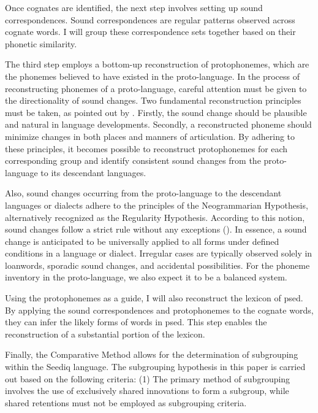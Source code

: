 Once cognates are identified, the next step involves setting up sound correspondences. Sound correspondences are regular patterns observed across cognate words. I will group these correspondence sets together based on their phonetic similarity. 

The third step employs a bottom-up reconstruction of protophonemes, which are the phonemes believed to have existed in the proto-language. In the process of reconstructing phonemes of a proto-language, careful attention must be given to the directionality of sound changes. Two fundamental reconstruction principles must be taken, as pointed out by \textcite[85]{crowley2010introduction}. Firstly, the sound change should be plausible and natural in language developments. Secondly, a reconstructed phoneme should minimize changes in both places and manners of articulation. By adhering to these principles, it becomes possible to reconstruct protophonemes for each corresponding group and identify consistent sound changes from the proto-language to its descendant languages.

Also, sound changes occurring from the proto-language to the descendant languages or dialects adhere to the principles of the Neogrammarian Hypothesis, alternatively recognized as the Regularity Hypothesis. According to this notion, sound changes follow a strict rule without any exceptions (\cite{brugmann1878morphologische}). In essence, a sound change is anticipated to be universally applied to all forms under defined conditions in a language or dialect. Irregular cases are typically observed solely in loanwords, sporadic sound changes, and accidental possibilities. For the phoneme inventory in the proto-language, we also expect it to be a balanced system. 

Using the protophonemes as a guide, I will also reconstruct the lexicon of \acl{psed}. By applying the sound correspondences and protophonemes to the cognate words, they can infer the likely forms of words in \acl{psed}. This step enables the reconstruction of a substantial portion of the lexicon.

Finally, the Comparative Method allows for the determination of subgrouping within the Seediq language. The subgrouping hypothesis in this paper is carried out based on the following criteria: (1) The primary method of subgrouping involves the use of exclusively shared innovations to form a subgroup, while shared retentions must not be employed as subgrouping criteria. 

